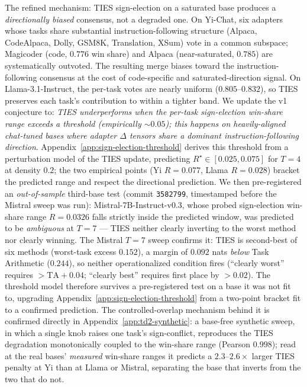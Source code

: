 The refined mechanism: TIES sign-election on a saturated base
produces a \emph{directionally biased} consensus, not a degraded
one. On Yi-Chat, six adapters whose tasks share substantial
instruction-following structure (Alpaca, CodeAlpaca, Dolly, GSM8K,
Translation, XSum) vote in a common subspace; Magicoder (code,
$0.776$ win share) and Alpaca (near-saturated, $0.785$) are
systematically outvoted. The resulting merge biases toward the
instruction-following consensus at the cost of code-specific and
saturated-direction signal. On Llama-3.1-Instruct, the per-task
votes are nearly uniform ($0.805$--$0.832$), so TIES preserves
each task's contribution to within a tighter band. We update the
v1 conjecture to: \emph{TIES underperforms when the per-task
sign-election win-share range exceeds a threshold (empirically
$\sim 0.05$); this happens on heavily-aligned chat-tuned bases
where adapter $\Delta$ tensors share a dominant
instruction-following direction}. Appendix~\ref{app:sign-election-threshold}
derives this threshold from a perturbation model of the TIES
update, predicting $R^\star \in [0.025, 0.075]$ for $T = 4$ at
density $0.2$; the two empirical points (Yi $R = 0.077$, Llama
$R = 0.028$) bracket the predicted range and respect the
directional prediction. We then pre-registered an \emph{out-of-sample}
third-base test (commit \texttt{3582799}, timestamped before the
Mistral sweep was run): Mistral-7B-Instruct-v0.3, whose probed
sign-election win-share range $R = 0.0326$ falls strictly inside the
predicted window, was predicted to be \emph{ambiguous} at $T = 7$ ---
TIES neither clearly inverting to the worst method nor clearly winning.
The Mistral $T = 7$ sweep confirms it: TIES is second-best of six
methods (worst-task excess $0.152$), a margin of $0.092$ nats
\emph{below} Task Arithmetic ($0.244$), so neither operationalized
condition fires (``clearly worst'' requires $> \mathrm{TA} + 0.04$;
``clearly best'' requires first place by $> 0.02$). The threshold
model therefore survives a pre-registered test on a base it was not
fit to, upgrading Appendix~\ref{app:sign-election-threshold} from a
two-point bracket fit to a confirmed prediction. The controlled-overlap
mechanism behind it is confirmed directly in
Appendix~\ref{app:td2-synthetic}: a base-free synthetic sweep, in which
a single knob raises one task's sign-conflict, reproduces the TIES
degradation monotonically coupled to the win-share range (Pearson
$0.998$); read at the real bases' \emph{measured} win-share ranges it
predicts a $2.3$--$2.6\times$ larger TIES penalty at Yi than at Llama or
Mistral, separating the base that inverts from the two that do not.

